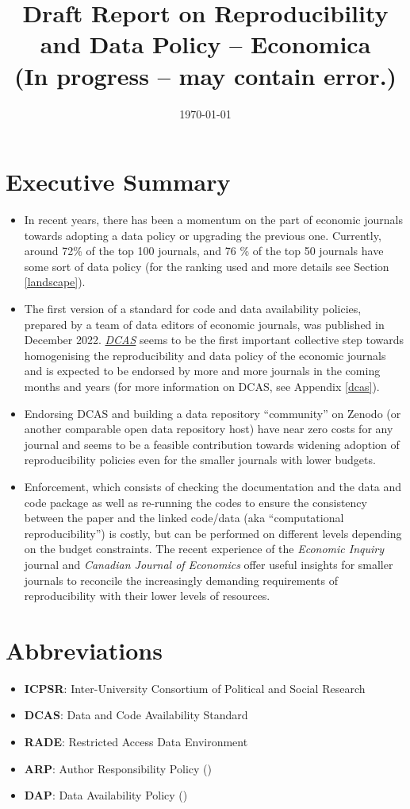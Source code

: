 \documentclass[11pt]{article}
\date{\today}
\title{\huge{Draft Report on Reproducibility and Data Policy -- Economica} \\ \vspace{5mm}\large(In progress -- may contain error.)}
\begin{document}
\maketitle
\tableofcontents
\newpage

\section*{Executive Summary}
\begin{itemize}
\item In recent years, there has been a momentum on the part of economic journals towards adopting a data policy or upgrading the previous one. Currently, around 72\% of the top 100 journals, and 76 \% of the top 50 journals have some sort of data policy (for the ranking used and more details see Section \ref{landscape}).
\item The first version of a standard for code and data availability policies, prepared by a team of data editors of economic journals, was published in December 2022. \href{https://datacodestandard.org/}{\textit{DCAS}} seems to be the first important collective step towards homogenising the reproducibility and data policy of the economic journals and is expected to be endorsed by more and more journals in the coming months and years (for more information on DCAS, see Appendix \ref{dcas}).
\item Endorsing DCAS and building a data repository ``community'' on Zenodo (or another comparable open data repository host) have near zero costs for any journal and seems to be a feasible contribution towards widening adoption of reproducibility policies even for the smaller journals with lower budgets.
\item Enforcement, which consists of checking the documentation and the data and code package as well as re-running the codes to ensure the consistency between the paper and the linked code/data (aka ``computational reproducibility'') is costly, but can be performed on different levels depending on the budget constraints. The recent experience of the \textit{Economic Inquiry} journal and \textit{Canadian Journal of Economics} offer useful insights for smaller journals to reconcile the increasingly demanding requirements of reproducibility with their lower levels of resources.
\end{itemize}

\newpage
\section*{Abbreviations}
\begin{itemize}
	\item \textbf{ICPSR}: Inter-University Consortium of Political and Social Research
	\item \textbf{DCAS}: Data and Code Availability Standard
	\item \textbf{RADE}: Restricted Access Data Environment
        \item \textbf{ARP}: Author Responsibility Policy (\cite{vlaeminck2015data})
        \item \textbf{DAP}: Data Availability Policy (\cite{vlaeminck2015data})
\end{itemize}
\end{document}
